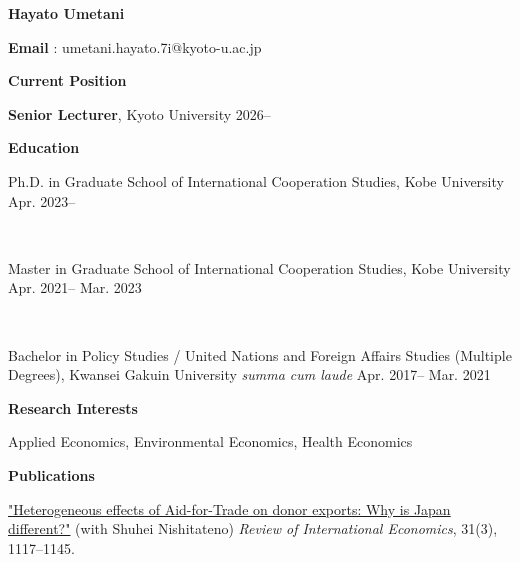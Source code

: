 \documentclass{article}
\begin{document}

\begin{center}
  \textbf{{\Large Hayato Umetani}}

  \textbf{Email} : umetani.hayato.7i@kyoto-u.ac.jp

\end{center}

\hrulefill

\begin{flushleft}
  \textbf{\large{Current Position}}
\end{flushleft}

\textbf{Senior Lecturer}, Kyoto University \hspace{\fill} 2026--

\hrulefill

\begin{flushleft}
  \textbf{\large{Education}}
\end{flushleft}

Ph.D. in Graduate School of International Cooperation Studies, Kobe University \hspace{\fill} Apr. 2023--

\ \

Master in Graduate School of International Cooperation Studies, Kobe University \hspace{\fill} Apr. 2021-- Mar. 2023

\ \

Bachelor in Policy Studies / United Nations and Foreign Affairs Studies (Multiple Degrees), Kwansei Gakuin University \textit{summa cum laude} \hspace{\fill} Apr. 2017-- Mar. 2021



\hrulefill

\begin{flushleft}
  \textbf{\large{Research Interests}}
\end{flushleft}

Applied Economics, Environmental Economics, Health Economics

\hrulefill

\begin{flushleft}
  \textbf{\large{Publications}}
\end{flushleft}

\href{https://doi.org/10.1111/roie.12656}{"Heterogeneous effects of Aid-for-Trade on donor exports: Why is Japan different?"} (with Shuhei Nishitateno) \textit{Review of International Economics}, 31(3), 1117--1145.
\end{document}
